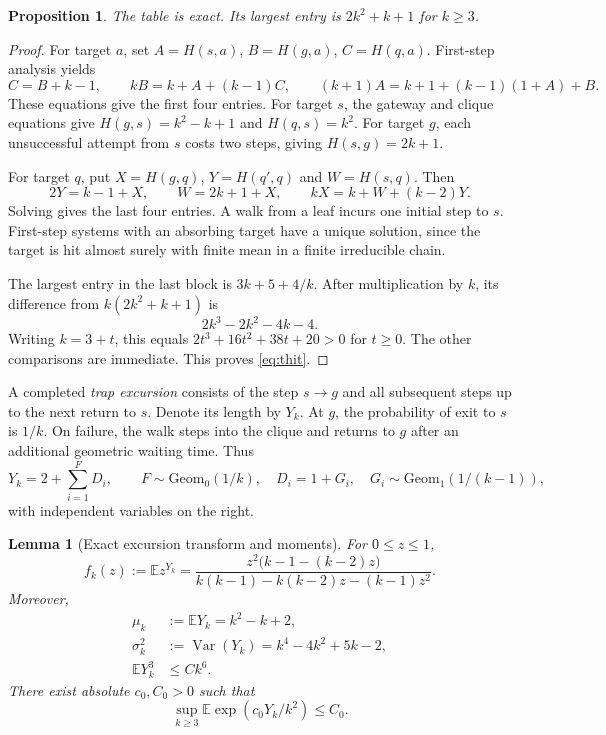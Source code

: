\documentclass[11pt]{amsart}
\newtheorem{lemma}[theorem]{Lemma}
\newtheorem{proposition}[theorem]{Proposition}
\theoremstyle{remark}
\numberwithin{equation}{section}
\DeclareMathOperator{\Var}{Var}
\newcommand{\E}{\mathbb{E}}
\newcommand{\Geom}{\mathrm{Geom}}
\begin{document}
\begin{proposition}\label{prop:table}
The table is exact. Its largest entry is $2k^2+k+1$ for $k\ge 3$.
\end{proposition}

\begin{proof}
For target $a$, set $A=H(s,a)$, $B=H(g,a)$, $C=H(q,a)$. First-step analysis yields
\[
C=B+k-1,\qquad kB=k+A+(k-1)C,\qquad (k+1)A=k+1+(k-1)(1+A)+B.
\]
These equations give the first four entries. For target $s$, the gateway and clique equations give $H(g,s)=k^2-k+1$ and $H(q,s)=k^2$. For target $g$, each unsuccessful attempt from $s$ costs two steps, giving $H(s,g)=2k+1$.

For target $q$, put $X=H(g,q)$, $Y=H(q',q)$ and $W=H(s,q)$. Then
\[
2Y=k-1+X,\qquad W=2k+1+X,\qquad kX=k+W+(k-2)Y.
\]
Solving gives the last four entries. A walk from a leaf incurs one initial step to $s$. First-step systems with an absorbing target have a unique solution, since the target is hit almost surely with finite mean in a finite irreducible chain.

The largest entry in the last block is $3k+5+4/k$. After multiplication by $k$, its difference from $k(2k^2+k+1)$ is
\[
2k^3-2k^2-4k-4.
\]
Writing $k=3+t$, this equals $2t^3+16t^2+38t+20>0$ for $t\ge 0$. The other comparisons are immediate. This proves \eqref{eq:thit}.
\end{proof}

A completed \emph{trap excursion} consists of the step $s\to g$ and all subsequent steps up to the next return to $s$. Denote its length by $Y_k$. At $g$, the probability of exit to $s$ is $1/k$. On failure, the walk steps into the clique and returns to $g$ after an additional geometric waiting time. Thus
\begin{equation}\label{eq:excursion}
Y_k=2+\sum_{i=1}^F D_i,\qquad F\sim\Geom_0(1/k),\quad D_i=1+G_i,\quad G_i\sim\Geom_1(1/(k-1)),
\end{equation}
with independent variables on the right.

\begin{lemma}[Exact excursion transform and moments]\label{lem:excursion}
For $0\le z\le 1$,
\begin{equation}\label{eq:pgf}
f_k(z):=\E z^{Y_k}=\frac{z^2\big(k-1-(k-2)z\big)}{k(k-1)-k(k-2)z-(k-1)z^2}.
\end{equation}
Moreover,
\begin{align}
\mu_k&:=\E Y_k=k^2-k+2,\label{eq:mu}\\
\sigma_k^2&:=\Var(Y_k)=k^4-4k^2+5k-2,\label{eq:sigma}\\
\E Y_k^3&\le Ck^6.\label{eq:third}
\end{align}
There exist absolute $c_0,C_0>0$ such that
\begin{equation}\label{eq:mgf}
\sup_{k\ge 3}\E\exp(c_0Y_k/k^2)\le C_0.
\end{equation}
\end{lemma}
\end{document}
